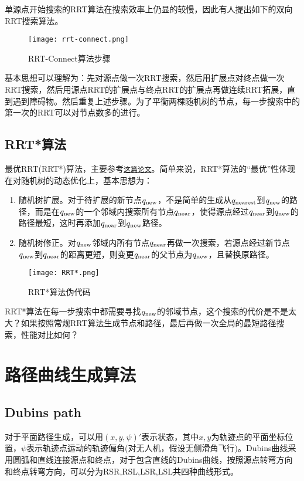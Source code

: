 单源点开始搜索的RRT算法在搜索效率上仍显的较慢，因此有人提出如下的双向RRT搜索算法。
\begin{figure}[htbp]
	\figskip 
	\centering
	\texttt{[image: rrt-connect.png]}	  
	\caption{\label{fig: rrt-connect} RRT-Connect算法步骤}
\end{figure}
基本思想可以理解为：先对源点做一次RRT搜索，然后用扩展点对终点做一次RRT搜索，然后用源点RRT的扩展点与终点RRT的扩展点再做连续RRT拓展，直到遇到障碍物。然后重复上述步骤。为了平衡两棵随机树的节点，每一步搜索中的第一次的RRT可以对节点数多的进行。

\subsection{RRT*算法}
最优RRT(RRT*)算法，主要参考\href{/attachment/Sampling-based Algorithms for Optimal Motion Planning10.1.1.419.5503.pdf}{\texttt{这篇论文}}。简单来说，RRT*算法的“最优”性体现在对随机树的动态优化上，基本思想为：

\begin{enumerate}
    \item 随机树扩展。对于待扩展的新节点$q_\rm{new}$，不是简单的生成从$q_\rm{nearest}$到$q_\rm{new}$的路径，而是在$q_\rm{new}$的一个邻域内搜索所有节点$q_\rm{near}$，使得源点经过$q_\rm{near}$到$q_\rm{new}$的路径最短，这时再添加$q_\rm{near}$到$q_\rm{new}$路径。
    \item 随机树修正。对$q_\rm{new}$邻域内所有节点$q_\rm{near}$再做一次搜索，若源点经过新节点$q_\rm{new}$到$q_\rm{near}$的距离更短，则变更$q_\rm{near}$的父节点为$q_\rm{new}$，且替换原路径。
\end{enumerate}

\begin{figure}[htbp]
	\figskip 
	\centering
	\texttt{[image: RRT*.png]}	  
	\caption{\label{fig: RRT*} RRT*算法伪代码}
\end{figure}


RRT*算法在每一步搜索中都需要寻找$q_\rm{new}$的邻域节点，这个搜索的代价是不是太大？如果按照常规RRT算法生成节点和路径，最后再做一次全局的最短路径搜索，性能对比如何？

\section{路径曲线生成算法}
\subsection{Dubins path}
对于平面路径生成，可以用$(x,y,\psi)'$表示状态，其中$x,y$为轨迹点的平面坐标位置，$\psi$表示轨迹点运动的轨迹偏角(对无人机，假设无侧滑角飞行)。Dubins曲线采用圆弧和直线连接源点和终点，对于包含直线的Dubins曲线，按照源点转弯方向和终点转弯方向，可以分为RSR,RSL,LSR,LSL共四种曲线形式。

